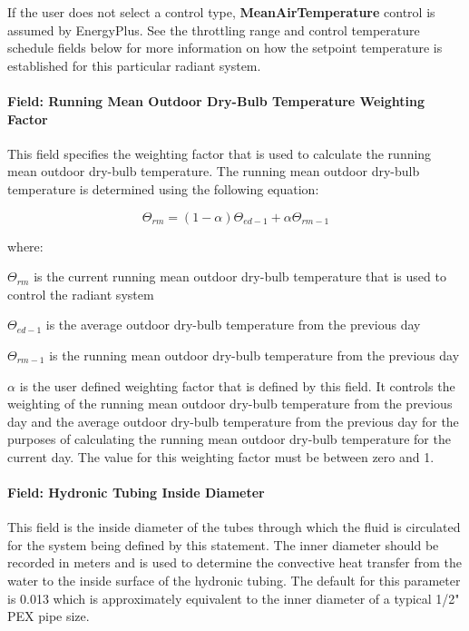 If the user does not select a control type, \textbf{MeanAirTemperature} control is assumed by EnergyPlus. See the throttling range and control temperature schedule fields below for more information on how the setpoint temperature is established for this particular radiant system.

\paragraph{Field: Running Mean Outdoor Dry-Bulb Temperature Weighting Factor}\label{field-running-mean-outdoor-dry-bulb-temperature-weighting-factor}

This field specifies the weighting factor that is used to calculate the running mean outdoor dry-bulb temperature.  The running mean outdoor dry-bulb temperature is determined using the following equation:

\begin{equation}
	\Theta_{rm} = (1 - \alpha) \Theta_{ed-1} + \alpha \Theta_{rm-1}
	\label{eq:RunningMeanOutdoorDryBulbTemperatureEquation}
\end{equation}

where:

\(\Theta_{rm}\) is the current running mean outdoor dry-bulb temperature that is used to control the radiant system

\(\Theta_{ed-1}\) is the average outdoor dry-bulb temperature from the previous day

\(\Theta_{rm-1}\) is the running mean outdoor dry-bulb temperature from the previous day

\(\alpha\) is the user defined weighting factor that is defined by this field.  It controls the weighting of the running mean outdoor dry-bulb temperature from the previous day and the average outdoor dry-bulb temperature from the previous day for the purposes of calculating the running mean outdoor dry-bulb temperature for the current day.  The value for this weighting factor must be between zero and 1.

\paragraph{Field: Hydronic Tubing Inside Diameter}\label{field-hydronic-tubing-inside-diameter-001}

This field is the inside diameter of the tubes through which the fluid is circulated for the system being defined by this statement. The inner diameter should be recorded in meters and is used to determine the convective heat transfer from the water to the inside surface of the hydronic tubing.  The default for this parameter is 0.013 which is approximately equivalent to the inner diameter of a typical 1/2" PEX pipe size.

